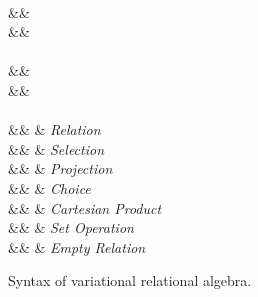 \begin{figure}
\begin{syntax}

 \\[1ex]
\bullet
  &\eqq&  \\
\circ
  &\eqq& \cup \myOR \cap \\[2ex]

 \\[1ex]
\vCond\in\vCondSet
  &\eqq&   \\
  &\myOR&  \\[2ex]

 \\[1ex]
\vQ\in\qSet
  &\eqq&  \vRel     & \textit{Relation}\\
  &\myOR& \vSel \vQ & \textit{Selection}\\
  &\myOR& \vPrj[\vAttList]{\vQ} & \textit{Projection}\\
  &\myOR& \chc{\vQ,\vQ} & \textit{Choice}\\
  &\myOR& \vQ \times \vQ & \textit{Cartesian Product}\\
  &\myOR& \vQ \circ \vQ  & \textit{Set Operation}\\
  &\myOR& \empRel & \textit{Empty Relation}

\end{syntax}

\caption[]{Syntax of variational relational algebra.}
\label{fig:v-alg-def}
\end{figure}
